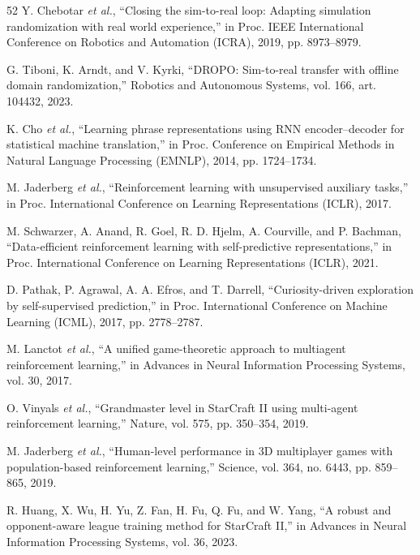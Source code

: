\documentclass[journal,twoside,web]{ieeecolor2}
\begin{document}
\begin{thebibliography}{52}
\label{bib:b38} Y. Chebotar \emph{et al.}, ``Closing the sim-to-real loop: Adapting simulation randomization with real world experience,'' in Proc. IEEE International Conference on Robotics and Automation (ICRA), 2019, pp. 8973--8979.

\label{bib:b39} G. Tiboni, K. Arndt, and V. Kyrki, ``DROPO: Sim-to-real transfer with offline domain randomization,'' Robotics and Autonomous Systems, vol. 166, art. 104432, 2023.

\label{bib:b40} K. Cho \emph{et al.}, ``Learning phrase representations using RNN encoder--decoder for statistical machine translation,'' in Proc. Conference on Empirical Methods in Natural Language Processing (EMNLP), 2014, pp. 1724--1734.

\label{bib:b41} M. Jaderberg \emph{et al.}, ``Reinforcement learning with unsupervised auxiliary tasks,'' in Proc. International Conference on Learning Representations (ICLR), 2017.

\label{bib:b42} M. Schwarzer, A. Anand, R. Goel, R. D. Hjelm, A. Courville, and P. Bachman, ``Data-efficient reinforcement learning with self-predictive representations,'' in Proc. International Conference on Learning Representations (ICLR), 2021.

\label{bib:b43} D. Pathak, P. Agrawal, A. A. Efros, and T. Darrell, ``Curiosity-driven exploration by self-supervised prediction,'' in Proc. International Conference on Machine Learning (ICML), 2017, pp. 2778--2787.

\label{bib:b44} M. Lanctot \emph{et al.}, ``A unified game-theoretic approach to multiagent reinforcement learning,'' in Advances in Neural Information Processing Systems, vol. 30, 2017.

\label{bib:b45} O. Vinyals \emph{et al.}, ``Grandmaster level in StarCraft II using multi-agent reinforcement learning,'' Nature, vol. 575, pp. 350--354, 2019.

\label{bib:b46} M. Jaderberg \emph{et al.}, ``Human-level performance in 3D multiplayer games with population-based reinforcement learning,'' Science, vol. 364, no. 6443, pp. 859--865, 2019.

\label{bib:b47} R. Huang, X. Wu, H. Yu, Z. Fan, H. Fu, Q. Fu, and W. Yang, ``A robust and opponent-aware league training method for StarCraft II,'' in Advances in Neural Information Processing Systems, vol. 36, 2023.


\end{thebibliography}
\end{document}
